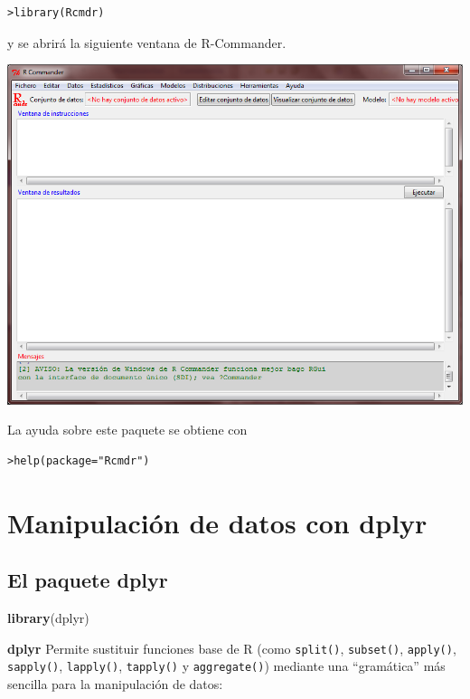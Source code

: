 \documentclass[]{book}
\newenvironment{Shaded}{\begin{snugshade}}{\end{snugshade}}
\newcommand{\KeywordTok}[1]{\textcolor[rgb]{0.13,0.29,0.53}{\textbf{#1}}}
\newcommand{\NormalTok}[1]{#1}
\begin{document}
\begin{verbatim}
>library(Rcmdr)
\end{verbatim}

y se abrirá la siguiente ventana de R-Commander.

\includegraphics{figuras/Rcommander3.png}

La ayuda sobre este paquete se obtiene con

\begin{verbatim}
>help(package="Rcmdr")
\end{verbatim}

\hypertarget{manipulacion-de-datos-con-dplyr}{%
\chapter{Manipulación de datos con dplyr}\label{manipulacion-de-datos-con-dplyr}}

\hypertarget{el-paquete-dplyr}{%
\section{\texorpdfstring{El paquete \textbf{dplyr}}{El paquete dplyr}}\label{el-paquete-dplyr}}

\begin{Shaded}
\begin{Highlighting}[]
\KeywordTok{library}\NormalTok{(dplyr)}
\end{Highlighting}
\end{Shaded}

\textbf{dplyr} Permite sustituir funciones base de R (como \texttt{split()}, \texttt{subset()},
\texttt{apply()}, \texttt{sapply()}, \texttt{lapply()}, \texttt{tapply()} y \texttt{aggregate()})
mediante una ``gramática'' más sencilla para la manipulación de datos:
\end{document}
